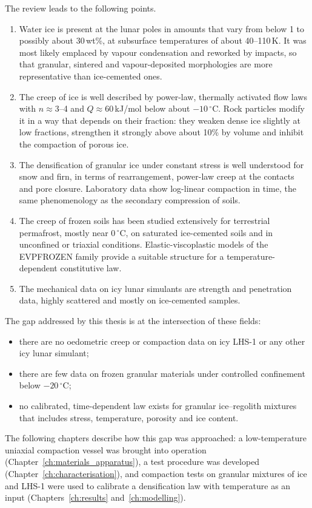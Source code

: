 The review leads to the following points.
\begin{enumerate}
    \item Water ice is present at the lunar poles in amounts that vary from below 1 to possibly about 30\,wt\%, at subsurface temperatures of about 40--110\,K. It was most likely emplaced by vapour condensation and reworked by impacts, so that granular, sintered and vapour-deposited morphologies are more representative than ice-cemented ones.
    \item The creep of ice is well described by power-law, thermally activated flow laws with $n\approx3$--4 and $Q\approx60$\,kJ/mol below about $-10\,^\circ$C. Rock particles modify it in a way that depends on their fraction: they weaken dense ice slightly at low fractions, strengthen it strongly above about 10\% by volume and inhibit the compaction of porous ice.
    \item The densification of granular ice under constant stress is well understood for snow and firn, in terms of rearrangement, power-law creep at the contacts and pore closure. Laboratory data show log-linear compaction in time, the same phenomenology as the secondary compression of soils.
    \item The creep of frozen soils has been studied extensively for terrestrial permafrost, mostly near $0\,^\circ$C, on saturated ice-cemented soils and in unconfined or triaxial conditions. Elastic-viscoplastic models of the EVPFROZEN family provide a suitable structure for a temperature-dependent constitutive law.
    \item The mechanical data on icy lunar simulants are strength and penetration data, highly scattered and mostly on ice-cemented samples.
\end{enumerate}

The gap addressed by this thesis is at the intersection of these fields:
\begin{itemize}
    \item there are no oedometric creep or compaction data on icy LHS-1 or any other icy lunar simulant;
    \item there are few data on frozen granular materials under controlled confinement below $-20\,^\circ$C;
    \item no calibrated, time-dependent law exists for granular ice--regolith mixtures that includes stress, temperature, porosity and ice content.
\end{itemize}
The following chapters describe how this gap was approached: a low-temperature uniaxial compaction vessel was brought into operation (Chapter~\ref{ch:materials_apparatus}), a test procedure was developed (Chapter~\ref{ch:characterisation}), and compaction tests on granular mixtures of ice and LHS-1 were used to calibrate a densification law with temperature as an input (Chapters~\ref{ch:results} and~\ref{ch:modelling}).
